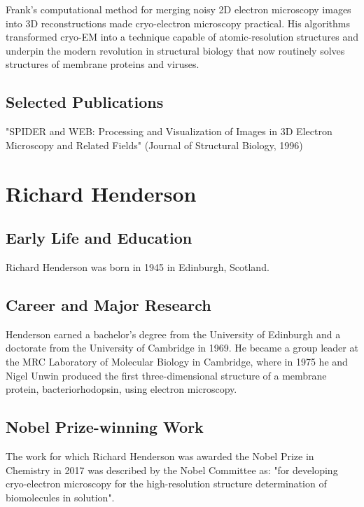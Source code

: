 Frank's computational method for merging noisy 2D electron microscopy images into 3D reconstructions made cryo-electron microscopy practical. His algorithms transformed cryo-EM into a technique capable of atomic-resolution structures and underpin the modern revolution in structural biology that now routinely solves structures of membrane proteins and viruses.

\subsection*{Selected Publications}

"SPIDER and WEB: Processing and Visualization of Images in 3D Electron Microscopy and Related Fields" (Journal of Structural Biology, 1996)

\clearpage

\section{Richard Henderson}

\subsection*{Early Life and Education}

Richard Henderson was born in 1945 in Edinburgh, Scotland.

\subsection*{Career and Major Research}

Henderson earned a bachelor's degree from the University of Edinburgh and a doctorate from the University of Cambridge in 1969. He became a group leader at the MRC Laboratory of Molecular Biology in Cambridge, where in 1975 he and Nigel Unwin produced the first three-dimensional structure of a membrane protein, bacteriorhodopsin, using electron microscopy.

\subsection*{Nobel Prize-winning Work}

The work for which Richard Henderson was awarded the Nobel Prize in Chemistry in 2017 was described by the Nobel Committee as: "for developing cryo-electron microscopy for the high-resolution structure determination of biomolecules in solution".

